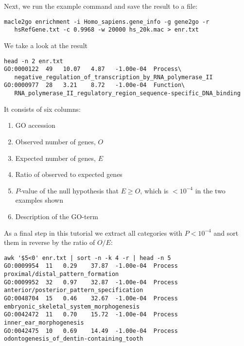 \documentclass[a4paper]{article}
\begin{document}
\normalsize
Next, we run the example command and save the result to a file:
\begin{lstlisting}
macle2go enrichment -i Homo_sapiens.gene_info -g gene2go -r
   hsRefGene.txt -c 0.9968 -w 20000 hs_20k.mac > enr.txt
\end{lstlisting}
We take a look at the result
\small
\begin{verbatim}
head -n 2 enr.txt
GO:0000122  49   10.07   4.87   -1.00e-04  Process\
   negative_regulation_of_transcription_by_RNA_polymerase_II
GO:0000977  28   3.21    8.72   -1.00e-04  Function\
   RNA_polymerase_II_regulatory_region_sequence-specific_DNA_binding
\end{verbatim}
\normalsize
It consists of six columns:
\begin{enumerate}
\item GO accession
\item Observed number of genes, $O$
\item Expected number of genes, $E$
\item Ratio of observed to expected genes
\item $P$-value of the null hypothesis that $E\ge O$, which is
  $<10^{-4}$ in the two examples shown
\item Description of the GO-term
\end{enumerate}
As a final step in this tutorial  we extract all categories with
$P<10^{-4}$ and sort them in reverse by the ratio of $O/E$:
\begin{verbatim}
awk '$5<0' enr.txt | sort -n -k 4 -r | head -n 5
GO:0009954  11   0.29    37.87  -1.00e-04  Process    proximal/distal_pattern_formation
GO:0009952  32   0.97    32.87  -1.00e-04  Process    anterior/posterior_pattern_specification
GO:0048704  15   0.46    32.67  -1.00e-04  Process    embryonic_skeletal_system_morphogenesis
GO:0042472  11   0.70    15.72  -1.00e-04  Process    inner_ear_morphogenesis
GO:0042475  10   0.69    14.49  -1.00e-04  Process    odontogenesis_of_dentin-containing_tooth
\end{verbatim}

\end{document}

